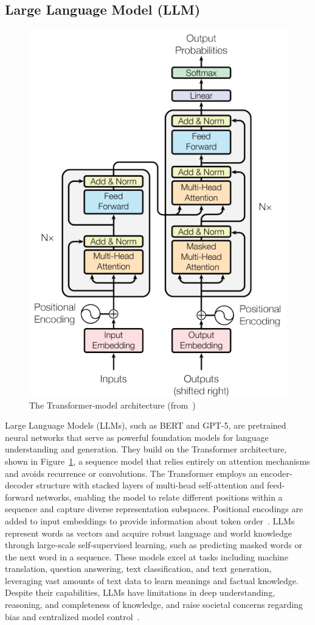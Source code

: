 \documentclass[12pt]{extarticle}
\begin{document}
\subsection{Large Language Model (LLM)}

\begin{figure}[htbp]
    \centering
    \includegraphics[width=0.5\linewidth]{transformer}
    \caption{The Transformer-model architecture
    (from~\cite{attention-is-all-you-need})}
    \label{fig:transformer}
\end{figure}

Large Language Models (LLMs), such as BERT and GPT-5, are pretrained neural networks that serve as powerful foundation models for language understanding and generation. They build on the Transformer architecture, shown in Figure~\ref{fig:transformer}, a sequence model that relies entirely on attention mechanisms and avoids recurrence or convolutions. The Transformer employs an encoder-decoder structure with stacked layers of multi-head self-attention and feed-forward networks, enabling the model to relate different positions within a sequence and capture diverse representation subspaces. Positional encodings are added to input embeddings to provide information about token order~\cite{attention-is-all-you-need}. LLMs represent words as vectors and acquire robust language and world knowledge through large-scale self-supervised learning, such as predicting masked words or the next word in a sequence. These models excel at tasks including machine translation, question answering, text classification, and text generation, leveraging vast amounts of text data to learn meanings and factual knowledge. Despite their capabilities, LLMs have limitations in deep understanding, reasoning, and completeness of knowledge, and raise societal concerns regarding bias and centralized model control~\cite{human-language-understanding}.
\end{document}
